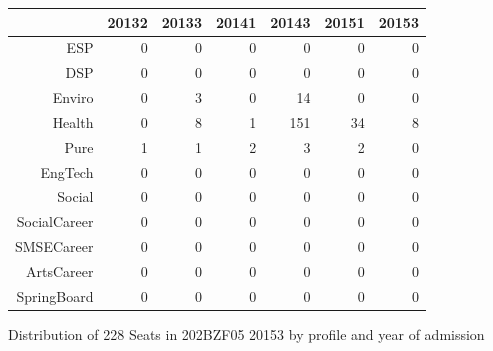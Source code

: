 \documentclass{article}\usepackage[]{graphicx}\usepackage[]{color}
\makeatletter
\newenvironment{kframe}{%
 \def\at@end@of@kframe{}%
 \ifinner\ifhmode%
  \def\at@end@of@kframe{\end{minipage}}%
  \begin{minipage}{\columnwidth}%
 \fi\fi%
 \def\FrameCommand##1{\hskip\@totalleftmargin \hskip-\fboxsep
 \colorbox{shadecolor}{##1}\hskip-\fboxsep
     \hskip-\linewidth \hskip-\@totalleftmargin \hskip\columnwidth}%
 \MakeFramed {\advance\hsize-\width
   \@totalleftmargin\z@ \linewidth\hsize
   \@setminipage}}%
 {\par\unskip\endMakeFramed%
 \at@end@of@kframe}
\makeatother
\begin{document}
\begin{figure}[H]
\centering
\begin{tabular}{rrrrrrr}
  \hline
 & 20132 & 20133 & 20141 & 20143 & 20151 & 20153 \\ 
  \hline
ESP &   0 &   0 &   0 &   0 &   0 &   0 \\ 
  DSP &   0 &   0 &   0 &   0 &   0 &   0 \\ 
  Enviro &   0 &   3 &   0 &  14 &   0 &   0 \\ 
  Health &   0 &   8 &   1 & 151 &  34 &   8 \\ 
  Pure &   1 &   1 &   2 &   3 &   2 &   0 \\ 
  EngTech &   0 &   0 &   0 &   0 &   0 &   0 \\ 
  Social &   0 &   0 &   0 &   0 &   0 &   0 \\ 
  SocialCareer &   0 &   0 &   0 &   0 &   0 &   0 \\ 
  SMSECareer &   0 &   0 &   0 &   0 &   0 &   0 \\ 
  ArtsCareer &   0 &   0 &   0 &   0 &   0 &   0 \\ 
  SpringBoard &   0 &   0 &   0 &   0 &   0 &   0 \\ 
   \hline
\end{tabular}
\caption{Distribution of 228 Seats in 202BZF05 20153 by profile and year of admission} 
\end{figure}
\begin{kframe}

{\ttfamily\noindent\bfseries\color{errorcolor}{\#\# Error in characters | factors: operations are possible only for numeric, logical or complex types}}\end{kframe}
\end{document}

